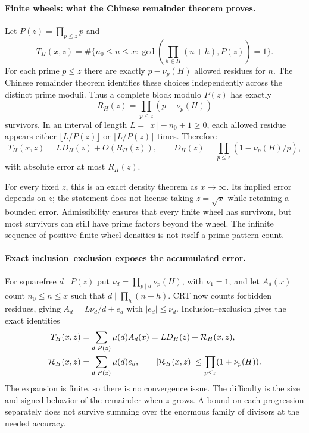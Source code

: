 \documentclass[11pt]{article}
\begin{document}
\paragraph{Finite wheels: what the Chinese remainder theorem proves.}
Let $P(z)=\prod_{p\le z}p$ and
\[
 T_H(x,z)=\#\{n_0\le n\le x:
                   \gcd(\prod_{h\in H}(n+h),P(z))=1\}.
\]
For each prime $p\le z$ there are exactly $p-\nu_p(H)$ allowed
residues for $n$. The Chinese remainder theorem identifies these choices
independently across the distinct prime moduli. Thus a complete block
modulo $P(z)$ has exactly
\[
 R_H(z)=\prod_{p\le z}(p-\nu_p(H))
\]
survivors. In an interval of length $L=\lfloor x\rfloor-n_0+1\ge0$,
each allowed residue appears either $\lfloor L/P(z)\rfloor$ or
$\lceil L/P(z)\rceil$ times. Therefore
\begin{equation}\label{ra:18:wheel}
 T_H(x,z)=L D_H(z)+O(R_H(z)),\qquad
 D_H(z)=\prod_{p\le z}(1-\nu_p(H)/p),
\end{equation}
with absolute error at most $R_H(z)$.

For every fixed $z$, this is an exact density theorem as $x\to\infty$.
Its implied error depends on $z$; the statement does not license taking
$z=\sqrt x$ while retaining a bounded error. Admissibility ensures that
every finite wheel has survivors, but most survivors can still have prime
factors beyond the wheel. The infinite sequence of positive finite-wheel
densities is not itself a prime-pattern count.

\paragraph{Exact inclusion--exclusion exposes the accumulated error.}
For squarefree $d\mid P(z)$ put
$\nu_d=\prod_{p\mid d}\nu_p(H)$, with $\nu_1=1$, and let
$A_d(x)$ count $n_0\le n\le x$ such that $d\mid\prod_h(n+h)$.
CRT now counts forbidden residues, giving
$A_d=L\nu_d/d+e_d$ with $|e_d|\le\nu_d$.
Inclusion--exclusion gives the exact identities
\begin{align}
 T_H(x,z)&=\sum_{d\mid P(z)}\mu(d)A_d(x)
           =L D_H(z)+\mathcal R_H(x,z),\label{ra:18:IE}\\
 \mathcal R_H(x,z)&=\sum_{d\mid P(z)}\mu(d)e_d,
 \qquad |\mathcal R_H(x,z)|\le\prod_{p\le z}(1+\nu_p(H)).\notag
\end{align}
The expansion is finite, so there is no convergence issue. The difficulty
is the size and signed behavior of the remainder when $z$ grows. A bound
on each progression separately does not survive summing over the enormous
family of divisors at the needed accuracy.
\end{document}
